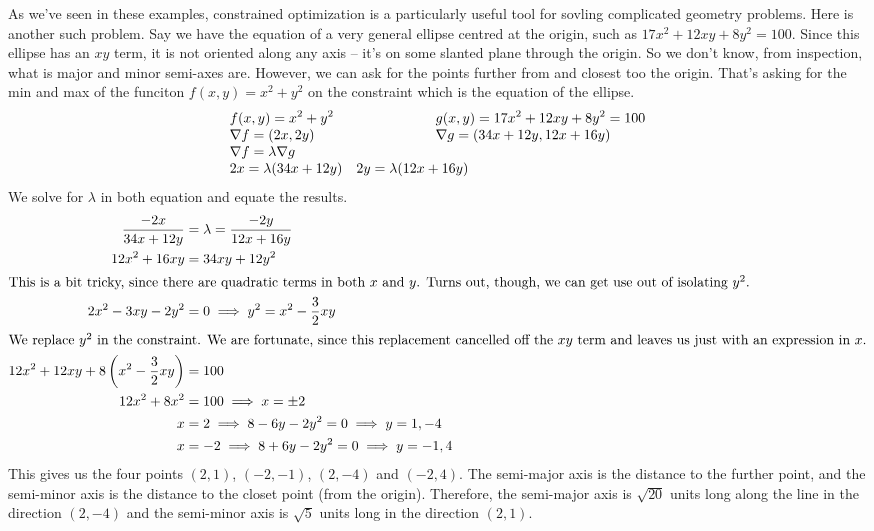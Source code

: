 \documentclass[fleqn,letterpaper]{report}
\begin{document}
\begin{example}
As we've seen in these examples, constrained optimization is a
particularly useful tool for sovling complicated geometry
problems. Here is another such problem.  Say we have the
equation of a very general ellipse centred at the origin, such
as $17x^2 + 12xy + 8y^2 = 100$. Since this ellipse has an $xy$
term, it is not oriented along any axis -- it's on some
slanted plane through the origin. So we don't know,
from inspection, what is major and minor semi-axes are.
However, we can ask for the points further from and closest
too the origin. That's asking for the min and max of the
funciton $f(x,y) = x^2 + y^2$ on the constraint which is the
equation of the ellipse.
\begin{displaymath}
\begin{array}{*2{>{\displaystyle}l}}
f(x,y) = x^2 + y^2 &
\hspace{2cm} g(x,y) = 17x^2 + 12xy + 8y^2 = 100 \\
\nabla f = (2x, 2y) &
\hspace{2cm} \nabla g = (34x + 12y, 12x + 16y) \\
\nabla f = \lambda \nabla g & \\
2x = \lambda( 34x + 12y) &
2y = \lambda( 12x + 16y) 
\end{array}
\end{displaymath}
We solve for $\lambda$ in both equation and equate the
results. 
\begin{align*}
\frac{-2x}{34x + 12 y} & = \lambda = \frac{-2y}{12 x + 16 y} \\
12x^2 + 16xy & = 34 xy + 12y^2 \\
\intertext{This is a bit tricky, since there are quadratic
terms in both $x$ and $y$. Turns out, though, we can get use
out of isolating $y^2$.}
2x^2 - 3xy - 2y^2 & = 0 \implies 
y^2 = x^2 - \frac{3}{2} xy \\
\intertext{We replace $y^2$ in the constraint. We are
fortunate, since this replacement cancelled off the $xy$ term
and leaves us just with an expression in $x$.}
12 x^2 + 12 xy + 8 \left( x ^2 - \frac{3}{2} xy \right) & =
100 \\
12x^2 + 8x^2 & = 100 \implies x = \pm 2 \\
x & = 2 \implies 8 - 6y - 2y^2 = 0 \implies y = 1, -4 \\
x & = -2 \implies 8 + 6y - 2y^2 = 0 \implies y = -1, 4 \\
\end{align*}
This gives us the four points $(2,1)$, $(-2,-1)$, $(2,-4)$ and
$(-2,4)$. The semi-major axis is the distance to the further
point, and the semi-minor axis is the distance to the closet
point (from the origin). Therefore, the semi-major axis is
$\sqrt{20}$ units long along the line in the direction
$(2,-4)$ and the semi-minor axis is $\sqrt{5}$ units long in
the direction $(2,1)$. 
\end{example}
\end{document}
